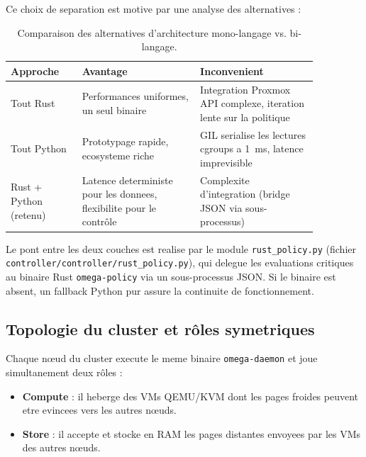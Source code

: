 Ce choix de separation est motive par une analyse des alternatives :

\begin{table}[htbp]
    \centering
    \caption{Comparaison des alternatives d'architecture mono-langage vs. bi-langage.}
    \label{tab:choix-langage}
    \begin{tabular}{p{0.20\linewidth} p{0.33\linewidth} p{0.33\linewidth}}
        \toprule
        \textbf{Approche} & \textbf{Avantage} & \textbf{Inconvenient} \\
        \midrule
        Tout Rust & Performances uniformes, un seul binaire & Integration Proxmox API complexe, iteration lente sur la politique \\
        Tout Python & Prototypage rapide, ecosysteme riche & GIL serialise les lectures cgroups a 1~ms, latence imprevisible \\
        Rust + Python (retenu) & Latence deterministe pour les donnees, flexibilite pour le contrôle & Complexite d'integration (bridge JSON via sous-processus) \\
        \bottomrule
    \end{tabular}
\end{table}

Le pont entre les deux couches est realise par le module \texttt{rust\_policy.py} (fichier \texttt{controller/controller/rust\_policy.py}), qui delegue les evaluations critiques au binaire Rust \texttt{omega-policy} via un sous-processus JSON. Si le binaire est absent, un fallback Python pur assure la continuite de fonctionnement.

\subsection{Topologie du cluster et rôles symetriques}
\label{subsec:topologie-cluster}

Chaque nœud du cluster execute le meme binaire \texttt{omega-daemon} et joue simultanement deux rôles :

\begin{itemize}
    \item \textbf{Compute} : il heberge des VMs QEMU/KVM dont les pages froides peuvent etre evincees vers les autres nœuds.
    \item \textbf{Store} : il accepte et stocke en RAM les pages distantes envoyees par les VMs des autres nœuds.
\end{itemize}

